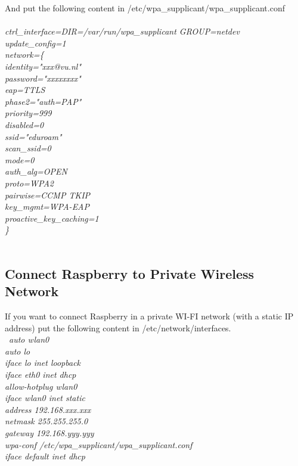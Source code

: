 \documentclass[12pt]{article}%
\begin{document}
		
		And put the following content in /etc/wpa\_supplicant/wpa\_supplicant.conf\\\\
		\textit{ctrl\_interface=DIR=/var/run/wpa\_supplicant GROUP=netdev  \\
			update\_config=1\\
			network=\{ \\
			identity="xxx@vu.nl" \\
			password="xxxxxxxx" \\
			eap=TTLS  \\
			phase2="auth=PAP"  \\
			priority=999  \\
			disabled=0  \\
			ssid="eduroam"  \\
			scan\_ssid=0  \\
			mode=0  \\
			auth\_alg=OPEN  \\
			proto=WPA2  \\
			pairwise=CCMP TKIP  \\
			key\_mgmt=WPA-EAP  \\
			proactive\_key\_caching=1  \\
		\}}\\\\

	\subsection{Connect Raspberry to Private Wireless Network}
		If you want to connect Raspberry in a private WI-FI network (with a static IP address) put the following content in /etc/network/interfaces. \\\
		\textit{auto wlan0\\
		auto lo\\
		iface lo inet loopback  \\
		iface eth0 inet dhcp\\
		allow-hotplug wlan0   \\
		iface wlan0 inet static  \\ 
		address 192.168.xxx.xxx  \\
		netmask 255.255.255.0   \\
		gateway 192.168.yyy.yyy   \\
		wpa-conf /etc/wpa\_supplicant/wpa\_supplicant.conf   \\
		iface default inet dhcp\\}
		
\end{document}
